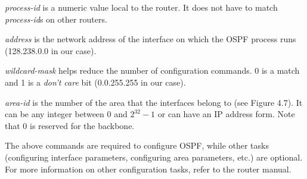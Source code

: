 \documentclass{../UTNetLab}
\begin{document}
    \textit{process-id} is a numeric value local to the router.
    It does not have to match \textit{process-id}s on other routers.

    \textit{address} is the network address of the interface on which the OSPF process runs (128.238.0.0 in our case).

    \textit{wildcard-mask} helps reduce the number of configuration commands.
    0 is a match and 1 is a \textit{don’t care} bit (0.0.255.255 in our case).

    \textit{area-id} is the number of the area that the interfaces belong to (see Figure 4.7).
    It can be any integer between 0 and $2^{32} - 1$ or can have an IP address form.
    Note that 0 is reserved for the backbone. 

    The above commands are required to configure OSPF, while other tasks (configuring interface parameters, configuring area parameters, etc.) are optional.
    For more information on other configuration tasks, refer to the router manual. 
\end{document}

